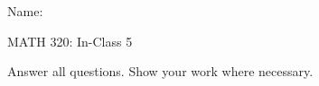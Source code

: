 \documentclass{article}
\begin{document}
\hspace{375pt}Name:

\begin{center}
{\Huge MATH 320: In-Class 5}

\end{center}

\bigskip\bigskip


Answer all questions. Show your work where necessary.\bigskip

\end{document}
